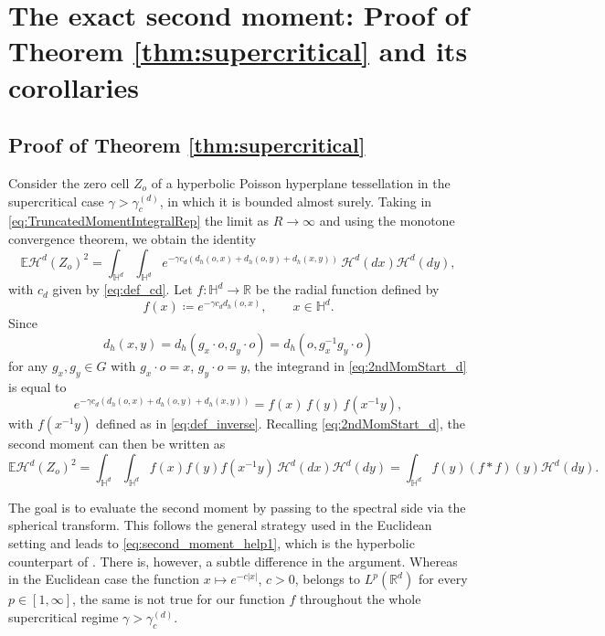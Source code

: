 \documentclass[11pt,a4paper]{article}
\theoremstyle{plain}
\theoremstyle{definition}
\theoremstyle{remark}
\def\EE{\mathbb{E}}
\def\HH{\mathbb{H}}
\def\RR{\mathbb{R}}
\def\cH{\mathcal{H}}
\begin{document}
\section{The exact second moment: Proof of Theorem \ref{thm:supercritical} and its corollaries}\label{sec:2ndMomentExact}

\subsection{Proof of Theorem \ref{thm:supercritical}}

Consider the zero cell $Z_o$ of a hyperbolic Poisson hyperplane tessellation in the supercritical case $\gamma>\gamma_c^{(d)}$, in which it is bounded almost surely. Taking in \eqref{eq:TruncatedMomentIntegralRep} the limit as $R\to\infty$ and using the monotone convergence theorem, we obtain the identity
\begin{equation}\label{eq:2ndMomStart_d}
	\EE\cH^d(Z_o)^2
	= \int_{\HH^d}\int_{\HH^d}
	e^{-\gamma c_d(d_h(o,x)+d_h(o,y)+d_h(x,y))}\,\cH^d(dx)\cH^d(dy),
\end{equation}
with $c_d$ given by \eqref{eq:def_cd}. Let $f: \HH^d \to \RR$ be the radial function defined by
$$f(x) \coloneqq e^{-\gamma c_d d_h(o,x)}, \qquad x \in \HH^d.$$
Since
\[ d_h(x,y) = d_h(g_x \cdot o, g_y \cdot o) = d_h(o,g_x^{-1}g_y \cdot o) \]
for any $g_x,g_y \in G$ with $g_x \cdot o = x$, $g_y \cdot o = y$, the integrand in \eqref{eq:2ndMomStart_d} is equal to
$$e^{-\gamma c_d(d_h(o,x)+d_h(o,y)+d_h(x,y))} = f(x)\,f(y)\,f(x^{-1}y),$$
with $f(x^{-1}y)$ defined as in \eqref{eq:def_inverse}.
Recalling \eqref{eq:2ndMomStart_d}, the second moment can then be written as
\begin{equation}\label{eq:2ndMomConvolution}
    \EE\cH^d(Z_o)^2
	= \int_{\HH^d}\int_{\HH^d}
	f(x) f(y) f(x^{-1}y)\,\cH^d(dx)\cH^d(dy)
    = \int_{\HH^d} f(y) (f*f)(y) \cH^d(dy).
\end{equation}

The goal is to evaluate the second moment by passing to the spectral side via the spherical transform.
This follows the general strategy used in the Euclidean setting and leads to \eqref{eq:second_moment_help1}, which is the hyperbolic counterpart of \cite[Equation (16.16)]{HS}.
There is, however, a subtle difference in the argument.
Whereas in the Euclidean case the function $x\mapsto e^{-c|x|}$, $c>0$, belongs to $L^p(\RR^d)$ for every $p\in[1,\infty]$, the same is not true for our function $f$ throughout the whole supercritical regime $\gamma>\gamma_c^{(d)}$.
\end{document}
